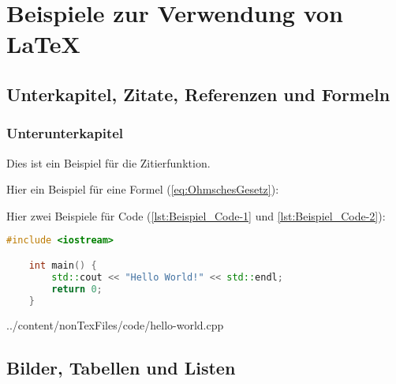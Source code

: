 


\chapter{Beispiele zur Verwendung von LaTeX}
   
\section{Unterkapitel, Zitate, Referenzen und Formeln}
\label{sec:Unterkapitel}

\subsection{Unterunterkapitel}

Dies ist ein Beispiel für die Zitierfunktion. \cite[Vgl.][S. 1 ff.]{Mustermann2023} 


\vspace{0.5cm}
Hier ein Beispiel für eine Formel (\ref{eq:OhmschesGesetz}):

\vspace{0.5cm}
Hier zwei Beispiele für Code (\ref{lst:Beispiel_Code-1} und \ref{lst:Beispiel_Code-2}):

\begin{lstlisting}[language=C++, caption={Beispiel: direktes einfügen von Code}, label={lst:Beispiel_Code-1}]
    #include <iostream>

    int main() {
        std::cout << "Hello World!" << std::endl;
        return 0;
    }
\end{lstlisting}


{../content/nonTexFiles/code/hello-world.cpp}


\newpage
\section{Bilder, Tabellen und Listen}

